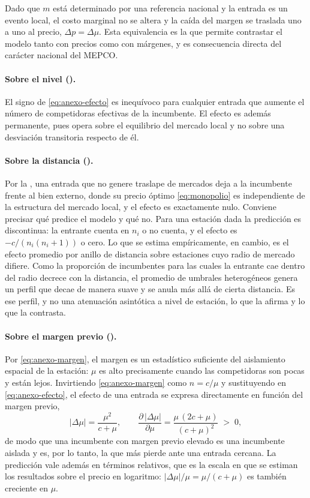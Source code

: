 Dado que $m$ está determinado por una referencia nacional y la entrada es un
evento local, el costo marginal no se altera y la caída del margen se traslada
uno a uno al precio, $\Delta p = \Delta\mu$. Esta equivalencia es la que permite
contrastar el modelo tanto con precios como con márgenes, y es consecuencia
directa del carácter nacional del MEPCO.

\paragraph{Sobre el nivel ().} El signo de
\eqref{eq:anexo-efecto} es inequívoco para cualquier entrada que aumente el
número de competidoras efectivas de la incumbente. El efecto es además
permanente, pues opera sobre el equilibrio del mercado local y no sobre una
desviación transitoria respecto de él.

\paragraph{Sobre la distancia ().} Por la
, una entrada que no genere traslape de mercados deja a la
incumbente frente al bien externo, donde su precio óptimo \eqref{eq:monopolio} es
independiente de la estructura del mercado local, y el efecto es exactamente
nulo. Conviene precisar qué predice el modelo y qué no. Para una estación dada la
predicción es discontinua: la entrante cuenta en $n_i$ o no cuenta, y el efecto es
$-c/(n_i(n_i+1))$ o cero. Lo que se estima empíricamente, en cambio, es el efecto
promedio por anillo de distancia sobre estaciones cuyo radio de mercado difiere.
Como la proporción de incumbentes para las cuales la entrante cae dentro del
radio decrece con la distancia, el promedio de umbrales heterogéneos genera un
perfil que decae de manera suave y se anula más allá de cierta distancia. Es ese
perfil, y no una atenuación asintótica a nivel de estación, lo que la
 afirma y lo que la  contrasta.

\paragraph{Sobre el margen previo ().} Por
\eqref{eq:anexo-margen}, el margen es un estadístico suficiente del aislamiento
espacial de la estación: $\mu$ es alto precisamente cuando las competidoras son
pocas y están lejos. Invirtiendo \eqref{eq:anexo-margen} como $n = c/\mu$ y
sustituyendo en \eqref{eq:anexo-efecto}, el efecto de una entrada se expresa
directamente en función del margen previo,
\begin{equation}
    |\Delta\mu| = \frac{\mu^{2}}{c + \mu} ,
    \qquad
    \frac{\partial\,|\Delta\mu|}{\partial\mu}
    = \frac{\mu\,(2c + \mu)}{(c + \mu)^{2}} \;>\; 0 ,
    \label{eq:het}
\end{equation}
de modo que una incumbente con margen previo elevado es una incumbente aislada y
es, por lo tanto, la que más pierde ante una entrada cercana. La predicción vale
además en términos relativos, que es la escala en que se estiman los resultados
sobre el precio en logaritmo: $|\Delta\mu|/\mu = \mu/(c+\mu)$ es también
creciente en $\mu$.


